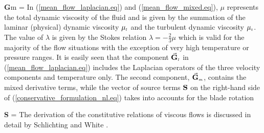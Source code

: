 %
\beq
 {\bf G}{\scriptstyle m} = 
 \label{mean_flow_mixed.eq}
\eeq
%
 In (\ref{mean_flow_laplacian.eq}) and (\ref{mean_flow_mixed.eq}),
 $\mu$ represents the total dynamic viscosity of the fluid and is given
 by the summation of the laminar (physical) dynamic viscosity $\mu_{\mbox{\tiny $l$}}$
 and the turbulent dynamic viscosity $\mu_{\mbox{\tiny $t$}}$.
 The value of $\lambda$ is given by the
 Stokes relation $\lambda = -\frac{2}{3} \mu$
 which is valid for the majority of the flow situations with the exception
 of very high temperature or pressure ranges.
 It is easily seen that the
 component $\vec{\bf G}_{\mbox{\tiny $l$}}$ in (\ref{mean_flow_laplacian.eq})
 includes  the Laplacian operators of the three velocity components and
 temperature only.
 The second component, $\vec{\bf G}_{\mbox{\tiny $m$}}$, contains the mixed derivative terms,
 while the vector of source terms ${\bf S}$ on the right-hand side of
 (\ref{conservative_formulation_nl.eq}) takes into accounts for the blade
 rotation

%
\beq
  {\bf S} = 
   \label{source_term.eq}
\eeq
%
 The derivation of the constitutive relations of viscous flows is discussed
 in detail by Schlichting \citeyear{Schlichting} and White \citeyear{White:1}.
